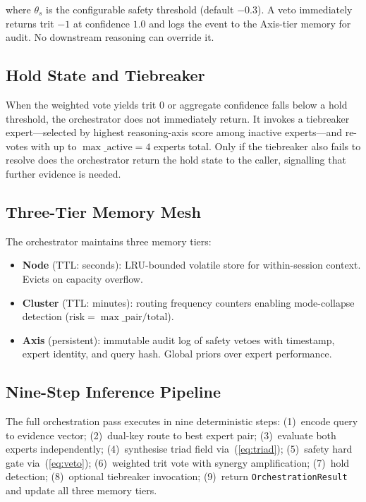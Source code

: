 \documentclass[journal,10pt,twocolumn]{IEEEtran}
\begin{document}
where $\theta_s$ is the configurable safety threshold (default $-0.3$).
A veto immediately returns trit $-1$ at confidence $1.0$ and logs the event
to the Axis-tier memory for audit. No downstream reasoning can override it.

\subsection{Hold State and Tiebreaker}

When the weighted vote yields trit $0$ or aggregate confidence falls below
a hold threshold, the orchestrator does not immediately return. It invokes a
tiebreaker expert—selected by highest reasoning-axis score among inactive
experts—and re-votes with up to $\max\_\text{active}=4$ experts total. Only
if the tiebreaker also fails to resolve does the orchestrator return the
hold state to the caller, signalling that further evidence is needed.

\subsection{Three-Tier Memory Mesh}

The orchestrator maintains three memory tiers:

\begin{itemize}
  \item \textbf{Node} (TTL: seconds): LRU-bounded volatile store for
        within-session context. Evicts on capacity overflow.
  \item \textbf{Cluster} (TTL: minutes): routing frequency counters enabling
        mode-collapse detection ($\text{risk} = \max\_\text{pair} / \text{total}$).
  \item \textbf{Axis} (persistent): immutable audit log of safety vetoes with
        timestamp, expert identity, and query hash. Global priors over expert
        performance.
\end{itemize}

\subsection{Nine-Step Inference Pipeline}

The full orchestration pass executes in nine deterministic steps:
(1)~encode query to evidence vector;
(2)~dual-key route to best expert pair;
(3)~evaluate both experts independently;
(4)~synthesise triad field via~(\ref{eq:triad});
(5)~safety hard gate via~(\ref{eq:veto});
(6)~weighted trit vote with synergy amplification;
(7)~hold detection;
(8)~optional tiebreaker invocation;
(9)~return \texttt{OrchestrationResult} and update all three memory tiers.
\end{document}
